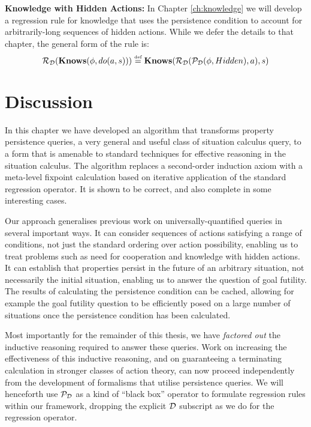 \textbf{Knowledge with Hidden Actions:} In Chapter \ref{ch:knowledge}
we will develop a regression rule for knowledge that uses the persistence
condition to account for arbitrarily-long sequences of hidden actions.
While we defer the details to that chapter, the general form of the
rule is:\[
\mathcal{R}_{\mathcal{D}}(\mathbf{Knows}(\phi,do(a,s)))\stackrel{\mbox{\tiny def}}{=}\mathbf{Knows}(\mathcal{R}_{\mathcal{D}}(\mathcal{P}_{\mathcal{D}}(\phi,Hidden),a),s)\]



\section{Discussion\label{sec:Persistence:Discussion}}

In this chapter we have developed an algorithm that transforms property
persistence queries, a very general and useful class of situation
calculus query, to a form that is amenable to standard techniques
for effective reasoning in the situation calculus. The algorithm replaces
a second-order induction axiom with a meta-level fixpoint calculation
based on iterative application of the standard regression operator.
It is shown to be correct, and also complete in some interesting cases.

Our approach generalises previous work on universally-quantified queries
in several important ways. It can consider sequences of actions satisfying
a range of conditions, not just the standard ordering over action
possibility, enabling us to treat problems such as need for cooperation
and knowledge with hidden actions. It can establish that properties
persist in the future of an arbitrary situation, not necessarily the
initial situation, enabling us to answer the question of goal futility.
The results of calculating the persistence condition can be cached,
allowing for example the goal futility question to be efficiently
posed on a large number of situations once the persistence condition
has been calculated.

Most importantly for the remainder of this thesis, we have \emph{factored
out} the inductive reasoning required to answer these queries. Work
on increasing the effectiveness of this inductive reasoning, and on
guaranteeing a terminating calculation in stronger classes of action
theory, can now proceed independently from the development of formalisms
that utilise persistence queries. We will henceforth use $\mathcal{P}_{\mathcal{D}}$
as a kind of {}``black box'' operator to formulate regression rules
within our framework, dropping the explicit $\mathcal{D}$ subscript as we
do for the regression operator.

